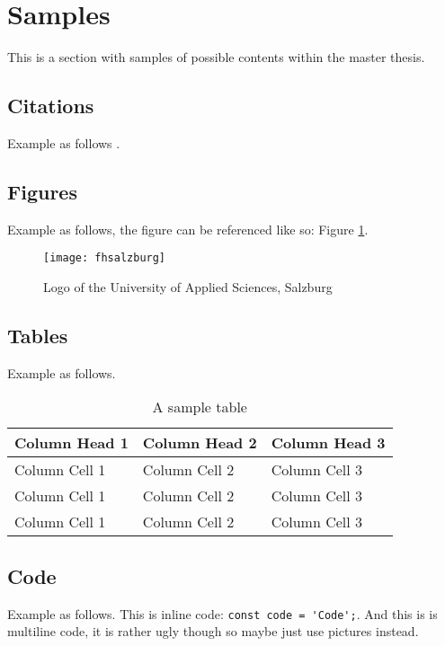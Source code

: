\section{Samples}

This is a section with samples of possible contents within the master thesis.

\subsection{Citations}

Example as follows \cite{wiki}.

\subsection{Figures}

Example as follows, the figure can be referenced like so: Figure \ref{fig:samples-logo}.

\begin{figure}[h]
  \centering
  \texttt{[image: fhsalzburg]}
  \caption{Logo of the University of Applied Sciences, Salzburg}
  \label{fig:samples-logo}
\end{figure}

\subsection{Tables}

Example as follows.

\begin{table}[h]
  \begin{tabularx}{\textwidth}{|X|X|X|}
    \hline
    \textbf{Column Head 1} & \textbf{Column Head 2} & \textbf{Column Head 3} \\ \hline \hline
    Column Cell 1 & Column Cell 2 & Column Cell 3 \\ \hline
    Column Cell 1 & Column Cell 2 & Column Cell 3 \\ \hline
    Column Cell 1 & Column Cell 2 & Column Cell 3 \\ \hline
  \end{tabularx}
  \caption{\label{tab:samples-table}A sample table}
\end{table}

\subsection{Code}

Example as follows. This is inline code: \verb|const code = 'Code';|. And this is is multiline code, it is rather ugly though so maybe just use pictures instead.

